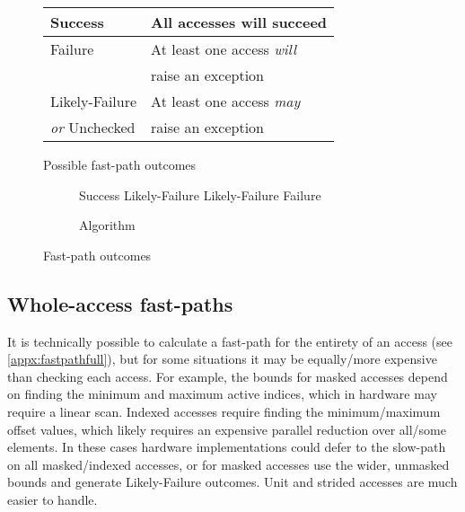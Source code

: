 \begin{figure}[t]
    \begin{subtable}{0.5\textwidth}
        \begin{tabular}{ll}
            \toprule
            Success & All accesses will succeed \\
            \midrule
            Failure & At least one access \emph{will}\\& raise an exception \\
            \midrule
            Likely-Failure & At least one access \emph{may} \\
            \emph{or} Unchecked & raise an exception \\
            \bottomrule
        \end{tabular}
        \caption{Possible fast-path outcomes}
    \end{subtable}%
    \hfill%
    \begin{subfigure}{0.45\textwidth}
        {
        \small
        \begin{algorithmic}
                    \State Success
                    \State Likely-Failure
                    \State Likely-Failure
                \Else{}
                    \State Failure
                \EndIf{}
        \end{algorithmic}
        }
        \caption{Algorithm}
    \end{subfigure}
    \caption{Fast-path outcomes}
\end{figure}

\subsection{Whole-access fast-paths}\label{chap:hardware:subsec:wholeaccessfastpath}
It is technically possible to calculate a fast-path for the entirety of an access (see \cref{appx:fastpathfull}), but for some situations it may be equally/more expensive than checking each access.
For example, the bounds for masked accesses depend on finding the minimum and maximum active indices, which in hardware may require a linear scan.
Indexed accesses require finding the minimum/maximum offset values, which likely requires an expensive parallel reduction over all/some elements.
In these cases hardware implementations could defer to the slow-path on all masked/indexed accesses, or for masked accesses use the wider, unmasked bounds and generate Likely-Failure outcomes.
Unit and strided accesses are much easier to handle.

